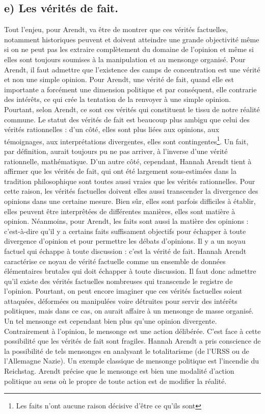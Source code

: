 \documentclass[12pt]{article}
\begin{document}
\subsection*{e) Les vérités de fait.}
Tout l'enjeu, pour Arendt, va être de montrer que ces vérités factuelles, notamment historiques peuvent et doivent atteindre une grande objectivité même si on ne peut pas les extraire complètement du domaine de l'opinion et même si elles sont toujours soumises à la manipulation et au mensonge organisé.
Pour Arendt, il faut admettre que l'existence des camps de concentration est une vérité et non une simple opinion.
Pour Arendt, une vérité de fait, quand elle est importante a forcément une dimension politique et par conséquent, elle contrarie des intérêts, ce qui crée la tentation de la renvoyer à une simple opinion.
Pourtant, selon Arendt, ce sont ces vérités qui constituent le tissu de notre réalité commune. 
Le statut des vérités de fait est beaucoup plus ambigu que celui des vérités rationnelles : d'un côté, elles sont plus liées aux opinions, aux témoignages, aux interprétations divergentes, elles sont contingentes\footnote{Les faits n'ont aucune raison décisive d'être ce qu'ils sont}.
Un fait, par définition, aurait toujours pu ne pas arriver, à l'inverse d'une vérité rationnelle, mathématique.
D'un autre côté, cependant, Hannah Arendt tient à affirmer que les vérités de fait, qui ont été largement sous-estimées dans la tradition philosophique sont toutes aussi vraies que les vérités rationnelles.
Pour cette raison, les vérités factuelles doivent elles aussi transcender la divergence des opinions dans une certaine mesure.
Bien sûr, elles sont parfois difficiles à établir, elles peuvent être interprêtées de différentes manières, elles sont matière à opinion.
Néanmoins, pour Arendt, les faits sont aussi la matière des opinions : c'est-à-dire qu'il y a certains faits suffisament objectifs pour échapper à toute divergence d'opinion et pour permettre les débats d'opinions.
Il y a un noyau factuel qui échappe à toute discussion : c'est la vérité de fait.
Hannah Arendt caractérise ce noyau de vérité factuelle comme un ensemble de données élémentaires brutales qui doit échapper à toute discussion.
Il faut donc admettre qu'il existe des vérités factuelles nombreuses qui transcende le registre de l'opinion.
Pourtant, on peut encore imaginer que ces vérités factuelles soient attaquées, déformées ou manipulées voire détruites pour servir des intérêts politiques, mais dans ce cas, on aurait affaire à un mensonge de masse organisé.
Un tel mensonge est cependant bien plus qu'une opinion divergente. Contrairement à l'opinion, le mensonge est une action délibérée.
C'est face à cette possibilité que les vérités de fait sont fragiles.
Hannah Arendt a pris conscience de la possibilité de tels mensonges en analysant le totalitarisme (de l'URSS ou de l'Allemagne Nazie).
Un exemple classique de mensonge politique est l'incendie du Reichstag.
Arendt précise que le mensonge est bien une modalité d'action politique au sens où le propre de toute action est de modifier la réalité.
\pagebreak
\end{document}
